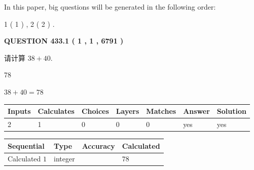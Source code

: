 \documentclass{ctexart}
\begin{document}
   
   
\vspace{0.2in}
   
In this paper, big questions will be generated in the following order: 
   
   
   1 ( 1 )
 ,
   2 ( 2 )
 .
  
\vspace{0.2in}
  
{\textbf{\Large{QUESTION
433.1 
 ( 1 , 1 , 6791 )
}}}
  
  
 
请计算 $ %
38 +  %
40 $.
 
 
 
\noindent{}
 
 

78
 
 
\noindent{}
 
 

 
 
 
\noindent{}
 
 

$ %
38 +  %
40=   %
78$
 
 
\noindent{}
 
 

 
   
   
   
   
\noindent\begin{tabular}{|l|l|l|l|l|l|l|}
 \hline
Inputs & Calculates & Choices & Layers & Matches & Answer & Solution \\ \hline
 2  & 
 1  & 
 0
  & 
 0  & 
 0  & 
  yes & 
  yes 
  \\ \hline
 \end{tabular}
   
   
   
   
\noindent{}
   
   
  
  
\noindent\begin{tabular}{|l|l|l|l|}
\hline
 Sequential & Type & Accuracy & Calculated \\ 
\hline
 
 
  Calculated $  1 $ & integer &  & 
  $ 78 $ 
 \\  \hline  
 \end{tabular}
   
\end{document}
